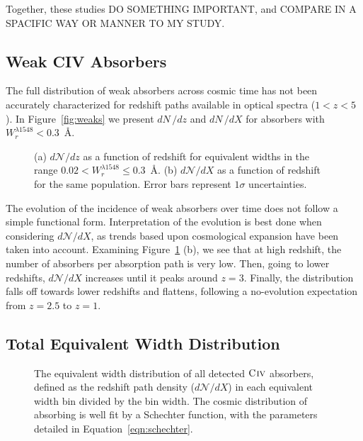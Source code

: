 \documentclass[linenumbers,twocolumn]{aastex61}
\begin{document}
Together, these studies DO SOMETHING IMPORTANT, and COMPARE IN A SPACIFIC WAY OR MANNER TO MY STUDY.

\subsection{Weak CIV Absorbers}
\label{weakciv}

The full distribution of weak {\CIV} absorbers across cosmic time has not been accurately characterized for redshift paths available in optical spectra ($1 < z < 5$). In Figure~\ref{fig:weaks} we present $dN\,/dz$ and $dN\,/dX$ for absorbers with $W_r^{\lambda1548} < 0.3$~\AA.

\begin{figure}[bth]
\caption{(a) $d\mathcal{N}\!/dz$ as a function of redshift for equivalent widths in the range $0.02 < W_{r}^{\lambda1548} \le 0.3$~{\AA}. (b) $d\mathcal{N}\!/dX$ as a function of redshift for the same population. Error bars represent $1\sigma$ uncertainties.}
\label{fig:dndzbetween}
\end{figure}

The evolution of the incidence of weak absorbers over time does not follow a simple functional form. Interpretation of the evolution is best done when considering $d\mathcal{N}\!/dX$, as trends based upon cosmological expansion have been taken into account. Examining Figure~\ref{fig:dndzbetween} (b), we see that at high redshift, the number of {\CIV} absorbers per absorption path is very low. Then, going to lower redshifts, $d\mathcal{N}\!/dX$ increases until it peaks around $z = 3$. Finally, the distribution falls off towards lower redshifts and flattens, following a no-evolution expectation from $z = 2.5$ to $z = 1$.

\subsection{Total Equivalent Width Distribution}
\label{totaldistro}

\begin{figure}[bth]
\caption{The equivalent width distribution of all detected ${\hbox{{\rm C}\kern 0.1em{\sc iv}}}$ absorbers, defined as the redshift path density ($d\mathcal{N}\!/dX$) in each equivalent width bin divided by the bin width. The cosmic distribution of absorbing {\CIV} is well fit by a Schechter function, with the parameters detailed in Equation~\ref{eqn:schechter}.}
\label{fig:totalewdistro}
\end{figure}
\end{document}
